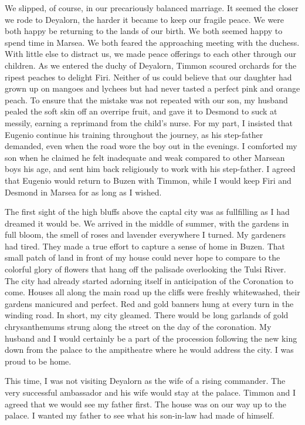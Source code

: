 \documentclass{article}
\begin{document}
We slipped, of course, in our precariously balanced marriage. It seemed the closer we rode to Deyalorn, the harder it became to keep our fragile peace. We were both happy be returning to the lands of our birth. We both seemed happy to spend time in Marsea. We both feared the approaching meeting with the duchess. With little else to distract us, we made peace offerings to each other through our children. As we entered the duchy of Deyalorn, Timmon scoured orchards for the ripest peaches to delight Firi. Neither of us could believe that our daughter had grown up on mangoes and lychees but had never tasted a perfect pink and orange peach. To ensure that the mistake was not repeated with our son, my husband pealed the soft skin off an overripe fruit, and gave it to Desmond to suck at messily, earning a reprimand from the child's nurse. For my part, I insisted that Eugenio continue his training throughout the journey, as his step-father demanded, even when the road wore the boy out in the evenings. I comforted my son when he claimed he felt inadequate and weak compared to other Marsean boys his age, and sent him back religiously to work with his step-father. I agreed that Eugenio would return to Buzen with Timmon, while I would keep Firi and Desmond in Marsea for as long as I wished.

The first sight of the high bluffs above the captal city was as fullfilling as I had dreamed it would be. We arrived in the middle of summer, with the gardens in full bloom, the smell of roses and lavender everywhere I turned. My gardeners had tired. They made a true effort to capture a sense of home in Buzen. That small patch of land in front of my house could never hope to compare to the colorful glory of flowers that hang off the palisade overlooking the Tulsi River. The city had already started adorning itself in anticipation of the Coronation to come. Houses all along the main road up the cliffs were freshly whitewashed, their gardens manicured and perfect. Red and gold banners hung at every turn in the winding road. In short, my city gleamed. There would be long garlands of gold chrysanthemums strung along the street on the day of the coronation. My husband and I would certainly be a part of the procession following the new king down from the palace to the ampitheatre where he would address the city. I was proud to be home.

This time, I was not visiting Deyalorn as the wife of a rising commander. The very successful ambassador and his wife would stay at the palace. Timmon and I agreed that we would see my father first. The house was on our way up to the palace. I wanted my father to see what his son-in-law had made of himself.
\end{document}
